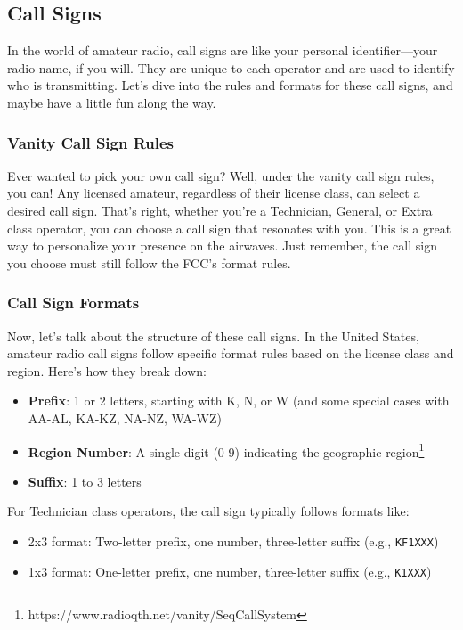 \subsection{Call Signs}
\label{subsec:call-signs}

In the world of amateur radio, call signs are like your personal identifier—your radio name, if you will. They are unique to each operator and are used to identify who is transmitting. Let’s dive into the rules and formats for these call signs, and maybe have a little fun along the way.

\subsubsection*{Vanity Call Sign Rules}
Ever wanted to pick your own call sign? Well, under the vanity call sign rules, you can! Any licensed amateur, regardless of their license class, can select a desired call sign. That’s right, whether you’re a Technician, General, or Extra class operator, you can choose a call sign that resonates with you. This is a great way to personalize your presence on the airwaves. Just remember, the call sign you choose must still follow the FCC’s format rules.

\subsubsection*{Call Sign Formats}
Now, let's talk about the structure of these call signs. In the United States, amateur radio call signs follow specific format rules based on the license class and region. Here's how they break down:

\begin{itemize}
    \item \textbf{Prefix}: 1 or 2 letters, starting with K, N, or W (and some special cases with AA-AL, KA-KZ, NA-NZ, WA-WZ)
    \item \textbf{Region Number}: A single digit (0-9) indicating the geographic region\footnote{https://www.radioqth.net/vanity/SeqCallSystem}
    \item \textbf{Suffix}: 1 to 3 letters
\end{itemize}

For Technician class operators, the call sign typically follows formats like:
\begin{itemize}
    \item 2x3 format: Two-letter prefix, one number, three-letter suffix (e.g., \texttt{KF1XXX})
    \item 1x3 format: One-letter prefix, one number, three-letter suffix (e.g., \texttt{K1XXX})
\end{itemize}


